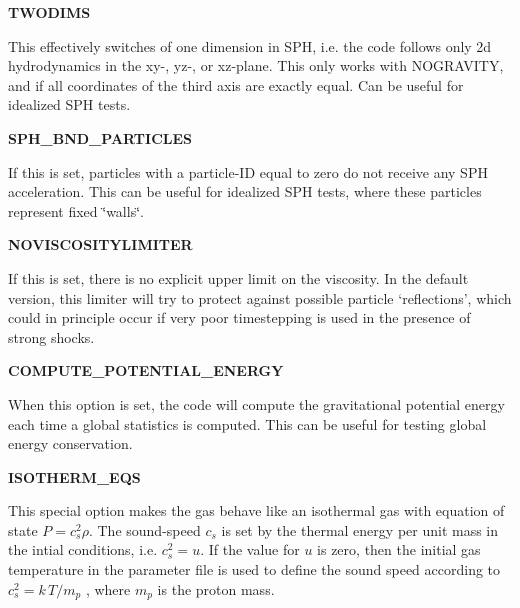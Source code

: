 \begin{DoxyItemize}
\item {\bfseries TWODIMS} \par
 This effectively switches of one dimension in SPH, i.e. the code follows only 2d hydrodynamics in the xy-\/, yz-\/, or xz-\/plane. This only works with NOGRAVITY, and if all coordinates of the third axis are exactly equal. Can be useful for idealized SPH tests.
\end{DoxyItemize}


\begin{DoxyItemize}
\item {\bfseries SPH\_\-BND\_\-PARTICLES} \par
 If this is set, particles with a particle-\/ID equal to zero do not receive any SPH acceleration. This can be useful for idealized SPH tests, where these particles represent fixed \char`\"{}walls\char`\"{}.
\end{DoxyItemize}


\begin{DoxyItemize}
\item {\bfseries NOVISCOSITYLIMITER} \par
 If this is set, there is no explicit upper limit on the viscosity. In the default version, this limiter will try to protect against possible particle `reflections', which could in principle occur if very poor timestepping is used in the presence of strong shocks.
\end{DoxyItemize}


\begin{DoxyItemize}
\item {\bfseries COMPUTE\_\-POTENTIAL\_\-ENERGY} \par
 When this option is set, the code will compute the gravitational potential energy each time a global statistics is computed. This can be useful for testing global energy conservation.
\end{DoxyItemize}


\begin{DoxyItemize}
\item {\bfseries ISOTHERM\_\-EQS} \par
 This special option makes the gas behave like an isothermal gas with equation of state $ P = c_s^2 \rho $. The sound-\/speed $ c_s $ is set by the thermal energy per unit mass in the intial conditions, i.e. $ c_s^2=u $. If the value for $ u $ is zero, then the initial gas temperature in the parameter file is used to define the sound speed according to $ c_s^2= k\,T/m_p $ , where $ m_p $ is the proton mass.
\end{DoxyItemize}


